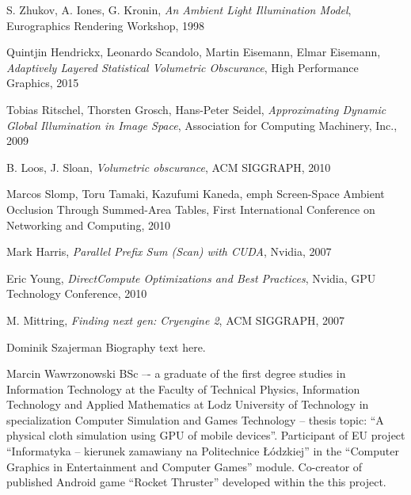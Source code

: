 \documentclass[10pt,journal,compsoc,twoside]{IEEEtran}
\begin{document}
\begin{thebibliography}{99}
 S. Zhukov, A. Iones, G. Kronin, \emph{An Ambient Light Illumination Model}, Eurographics Rendering Workshop, 1998

 Quintjin Hendrickx, Leonardo Scandolo, Martin Eisemann, Elmar Eisemann, \emph{Adaptively Layered Statistical Volumetric Obscurance}, High Performance Graphics, 2015

 Tobias Ritschel, Thorsten Grosch, Hans-Peter Seidel, \emph{Approximating Dynamic Global Illumination in Image Space}, Association for Computing Machinery, Inc., 2009

 B. Loos, J. Sloan, \emph{Volumetric obscurance}, ACM SIGGRAPH, 2010

 Marcos Slomp, Toru Tamaki, Kazufumi Kaneda, emph {Screen-Space Ambient Occlusion Through Summed-Area Tables}, First International Conference on Networking and Computing, 2010

 Mark Harris, \emph{Parallel Prefix Sum (Scan) with CUDA}, Nvidia, 2007

 Eric Young, \emph{DirectCompute Optimizations and Best Practices}, Nvidia, GPU Technology Conference, 2010

 M. Mittring, \emph{Finding next gen: Cryengine 2}, ACM SIGGRAPH, 2007

\end{thebibliography}

\begin{IEEEbiography}{Dominik Szajerman}
Biography text here.
\end{IEEEbiography}

\begin{IEEEbiography}
{Marcin Wawrzonowski}
BSc –- a graduate of the first degree studies in Information Technology at the Faculty of Technical Physics, Information Technology and Applied Mathematics at Lodz University of Technology in specialization Computer Simulation and Games Technology – thesis topic: ``A physical cloth simulation using GPU of mobile devices''. Participant of EU project ``Informatyka -- kierunek zamawiany na Politechnice {\L}{\'o}dzkiej'' in the ``Computer Graphics in Entertainment and Computer Games'' module. Co-creator of published Android game ``Rocket Thruster'' developed within the this project.
\end{IEEEbiography}

\enlargethispage{-5in}
\end{document}
